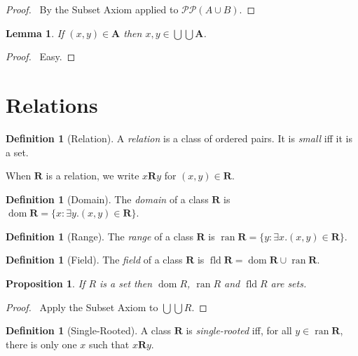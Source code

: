 \documentclass{article}
\let\qed\relax
\newtheorem{lemma}[axiom]{Lemma}
\newtheorem{proposition}[axiom]{Proposition}
\theoremstyle{definition}
\newtheorem{definition}[axiom]{Definition}
\newcommand{\dom}{\ensuremath{\operatorname{dom}}}
\newcommand{\fld}{\ensuremath{\operatorname{fld}}}
\newcommand{\ran}{\ensuremath{\operatorname{ran}}}
\begin{document}
    \begin{proof}
        \pf\ By the Subset Axiom applied to $\mathcal{PP}(A \cup B)$. \qed
    \end{proof}

    \begin{lemma}
        If $(x,y) \in \mathbf{A}$ then $x, y \in \bigcup \bigcup \mathbf{A}$.
    \end{lemma}

    \begin{proof}
        \pf\ Easy. \qed
    \end{proof}

    \section{Relations}

    \begin{definition}[Relation]
        A \emph{relation} is a class of ordered pairs. It is \emph{small} iff it is a set.

        When $\mathbf{R}$ is a relation, we write $x \mathbf{R} y$ for $(x,y) \in \mathbf{R}$.
    \end{definition}

    \begin{definition}[Domain]
        The \emph{domain} of a class $\mathbf{R}$ is $\dom \mathbf{R} = \{ x : \exists y. (x,y) \in \mathbf{R} \}$.
    \end{definition}

    \begin{definition}[Range]
        The \emph{range} of a class $\mathbf{R}$ is $\ran \mathbf{R} = \{ y : \exists x. (x,y) \in \mathbf{R} \}$.
    \end{definition}

    \begin{definition}[Field]
        The \emph{field} of a class $\mathbf{R}$ is $\fld \mathbf{R} = \dom \mathbf{R} \cup \ran \mathbf{R}$.
    \end{definition}

    \begin{proposition}
        If $R$ is a set then $\dom R$, $\ran R$ and $\fld R$ are sets.
    \end{proposition}

    \begin{proof}
        \pf\ Apply the Subset Axiom to $\bigcup \bigcup R$. \qed
    \end{proof}
    
    \begin{definition}[Single-Rooted]
        A class $\mathbf{R}$ is \emph{single-rooted} iff, for all $y \in \ran \mathbf{R}$,
        there is only one $x$ such that $x \mathbf{R} y$.
    \end{definition}
\end{document}

